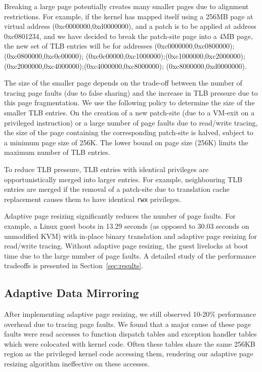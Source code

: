 \documentclass[10pt,twocolumn]{article}
\begin{document}
Breaking a large page potentially creates
many smaller pages due to alignment restrictions.
For example, if the kernel has mapped
itself using a 256MB page at virtual address (0xc0000000,0xd0000000), and a
patch is to be applied at address 0xc0801234, and we have decided to break
the patch-site page into a 4MB page, the new set of TLB entries will be for
addresses
(0xc0000000,0xc0800000);(0xc0800000,0xc0c00000);
(0xc0c00000,0xc1000000);(0xc1000000,0xc2000000);
(0xc2000000,0xc4000000);(0xc4000000,0xc8000000);
(0xc8000000,0xd0000000).

The size of the smaller page depends on the trade-off between the number
of tracing page faults (due to false sharing) and the increase in TLB pressure
due to this page fragmentation.
We use the following policy to determine the size of the smaller TLB entries. On the
creation of a new patch-site (due to a VM-exit on a privileged instruction) or a
large number of page faults due to read/write tracing,
the size of the page
containing the corresponding patch-site is halved, subject to
a minimum page size of 256K.
The lower bound on page size (256K) limits the maximum number of TLB entries.

To reduce TLB pressure, TLB entries with identical privileges are
opportunistically merged into
larger entries. For example, neighbouring TLB entries are merged if the
removal of a patch-site due to translation cache replacement causes
them to have identical {\tt rwx} privileges.

Adaptive page resizing significantly reduces the number of page faults. For
example, a Linux guest boots in 13.29 seconds (as opposed to 30.03 seconds on
unmodified KVM) with in-place binary translation
and adaptive page resizing for read/write tracing. Without adaptive page resizing,
the guest livelocks at boot time due to the large number of
page faults. A detailed study of the performance tradeoffs is presented in
Section~\ref{sec:results}.

\subsection{Adaptive Data Mirroring}
After implementing adaptive page resizing,
we still observed 10-20\% performance overhead due
to tracing page faults. We found that a major cause of these page faults were
read accesses to function dispatch tables and exception handler tables which were
colocated with kernel code. Often these tables share
the same 256KB region as the privileged kernel code accessing them, rendering our
adaptive page resizing algorithm ineffective on these accesses.
\end{document}
